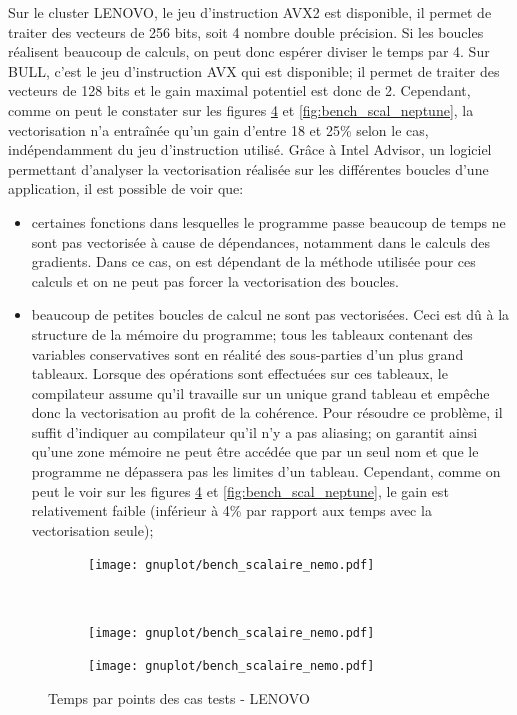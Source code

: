 Sur le cluster LENOVO, le jeu d'instruction AVX2 est disponible, il permet de traiter des vecteurs de 256 bits, soit 4 nombre double précision. Si les boucles réalisent beaucoup de calculs, on peut donc espérer diviser le temps par 4. Sur BULL, c'est le jeu d'instruction AVX qui est disponible; il permet de traiter des vecteurs de 128 bits et le gain maximal potentiel est donc de 2. Cependant, comme on peut le constater sur les figures \ref{fig:bench_scal_nemo} et \ref{fig:bench_scal_neptune}, la vectorisation n'a entraînée qu'un gain d'entre 18 et 25\% selon le cas, indépendamment du jeu d'instruction utilisé. Grâce à Intel Advisor, un logiciel permettant d'analyser la vectorisation réalisée sur les différentes boucles d'une application, il est possible de voir que:
\begin{itemize}
\item certaines fonctions dans lesquelles le programme passe beaucoup de temps ne sont pas vectorisée à cause de dépendances, notamment dans le calculs des gradients. Dans ce cas, on est dépendant de la méthode utilisée pour ces calculs et on ne peut pas forcer la vectorisation des boucles.
\item beaucoup de petites boucles de calcul ne sont pas vectorisées. Ceci est dû à la structure de la mémoire du programme; tous les tableaux contenant des variables conservatives sont en réalité des sous-parties d'un plus grand tableaux. Lorsque des opérations sont effectuées sur ces tableaux, le compilateur assume qu'il travaille sur un unique grand tableau et empêche donc la vectorisation au profit de la cohérence. Pour résoudre ce problème, il suffit d'indiquer au compilateur qu'il n'y a pas aliasing; on garantit ainsi qu'une zone mémoire ne peut être accédée que par un seul nom et que le programme ne dépassera pas les limites d'un tableau. Cependant, comme on peut le voir sur les figures \ref{fig:bench_scal_nemo} et \ref{fig:bench_scal_neptune}, le gain est relativement faible (inférieur à 4\% par rapport aux temps avec la vectorisation seule); 
\end{itemize}



\begin{figure}[!ht]
  \centering
  \begin{subfigure}[b]{0.5\textwidth}
    \centering
    \texttt{[image: gnuplot/bench\_scalaire\_nemo.pdf]}
  \caption{\label{fig:bench_scal_nemo_nonper}}
  \end{subfigure}%
  ~
  \begin{subfigure}[b]{0.5\textwidth}
    \centering
    \texttt{[image: gnuplot/bench\_scalaire\_nemo.pdf]}
  \caption{\label{fig:bench_scal_nemo_sym}}
  \end{subfigure}
  \begin{subfigure}[b]{0.5\textwidth}
    \centering
    \texttt{[image: gnuplot/bench\_scalaire\_nemo.pdf]}
  \caption{\label{fig:bench_scal_nemo_per}}
  \end{subfigure}
  \caption{\label{fig:bench_scal_nemo}Temps par points des cas tests - LENOVO}
\end{figure}



